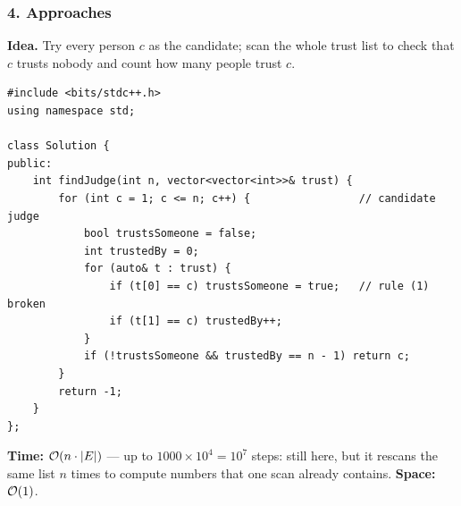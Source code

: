 \begin{diagrambox}
\end{diagrambox}

\subsubsection*{4. Approaches}

\begin{bruteforcebox}
\textbf{Idea.} Try every person $c$ as the candidate; scan the whole trust list to check that $c$ trusts nobody and count how many people trust $c$.
\begin{lstlisting}[style=cpp]
#include <bits/stdc++.h>
using namespace std;

class Solution {
public:
    int findJudge(int n, vector<vector<int>>& trust) {
        for (int c = 1; c <= n; c++) {                 // candidate judge
            bool trustsSomeone = false;
            int trustedBy = 0;
            for (auto& t : trust) {
                if (t[0] == c) trustsSomeone = true;   // rule (1) broken
                if (t[1] == c) trustedBy++;
            }
            if (!trustsSomeone && trustedBy == n - 1) return c;
        }
        return -1;
    }
};
\end{lstlisting}
\begin{complexitybox}
\textbf{Time:} $\mathcal{O}(n \cdot |E|)$ --- up to $1000 \times 10^4 = 10^7$ steps: still \ac{} here, but it rescans the same list $n$ times to compute numbers that one scan already contains. \textbf{Space:} $\mathcal{O}(1)$.
\end{complexitybox}
\end{bruteforcebox}

